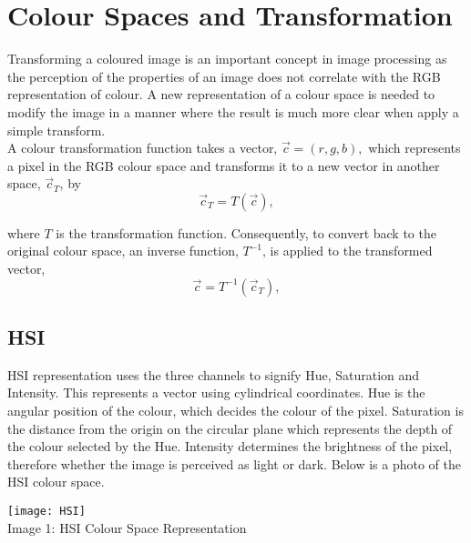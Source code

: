 \documentclass{article}
\begin{document}
	\section{Colour Spaces and Transformation}
	
	Transforming a coloured image is an important concept in image processing as the perception of the properties of an image does not correlate with the RGB representation of colour. A new representation of a colour space is needed to modify the image in a manner where the result is much more clear when apply a simple transform.\\
	
	A colour transformation function takes a vector, $\vec{c} = (r,g,b),$ which represents a pixel in the RGB colour space and transforms it to a new vector in another space, $\vec{c}_{T}$, by\\
	
	\begin{equation}
		\vec{c}_T = T(\vec{c}),
	\end{equation}
	
	where $T$ is the transformation function. Consequently, to convert back to the original colour space, an inverse function, $T^{-1}$, is applied to the transformed vector,\\
	
	\begin{equation}
	\vec{c} = T^{-1}(\vec{c}_{T}),
	\end{equation}
	
	\subsection{HSI}
	
	HSI representation uses the three channels to signify Hue, Saturation and Intensity. This represents a vector using cylindrical coordinates. Hue is the angular position of the colour, which decides the colour of the pixel. Saturation is the distance from the origin on the circular plane which represents the depth of the colour selected by the Hue. Intensity determines the brightness of the pixel, therefore whether the image is perceived as light or dark. Below is a photo of the HSI colour space.\\
	
	 \begin{center}
	 	\noindent \texttt{[image: HSI]}\\
	 	Image 1: HSI Colour Space Representation\\
	 \end{center}
	
\end{document}
